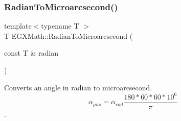 \mbox{\label{group___e_g_x_math-_angle_conversions-_radian_ga3a515ca2838a305fa40750763f546a86}} 
\subsubsection{\texorpdfstring{Radian\+To\+Microarcsecond()}{RadianToMicroarcsecond()}}
{\footnotesize\ttfamily template$<$typename T $>$ \\
T E\+G\+X\+Math\+::\+Radian\+To\+Microarcsecond (\begin{DoxyParamCaption}\item[{const T \&}]{radian }\end{DoxyParamCaption})}



Converts an angle in radian to microarcsecond. \[\alpha_{\mu as}=\alpha_{rad}\frac{180 * 60 * 60 * 10^6}{\pi}\]. 

